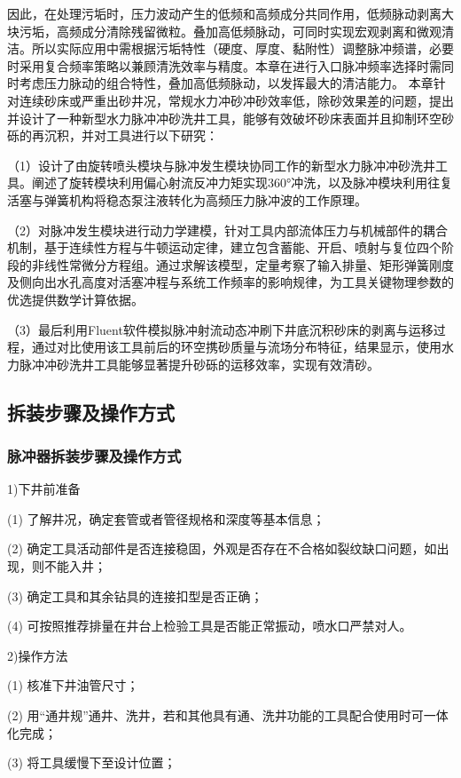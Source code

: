 因此，在处理污垢时，压力波动产生的低频和高频成分共同作用，低频脉动剥离大块污垢，高频成分清除残留微粒。叠加高低频脉动，可同时实现宏观剥离和微观清洁。所以实际应用中需根据污垢特性（硬度、厚度、黏附性）调整脉冲频谱，必要时采用复合频率策略以兼顾清洗效率与精度。本章在进行入口脉冲频率选择时需同时考虑压力脉动的组合特性，叠加高低频脉动，以发挥最大的清洁能力。
本章针对连续砂床或严重出砂井况，常规水力冲砂冲砂效率低，除砂效果差的问题，提出并设计了一种新型水力脉冲冲砂洗井工具，能够有效破坏砂床表面并且抑制环空砂砾的再沉积，并对工具进行以下研究：

（1）设计了由旋转喷头模块与脉冲发生模块协同工作的新型水力脉冲冲砂洗井工具。阐述了旋转模块利用偏心射流反冲力矩实现360°冲洗，以及脉冲模块利用往复活塞与弹簧机构将稳态泵注液转化为高频压力脉冲波的工作原理。

（2）对脉冲发生模块进行动力学建模，针对工具内部流体压力与机械部件的耦合机制，基于连续性方程与牛顿运动定律，建立包含蓄能、开启、喷射与复位四个阶段的非线性常微分方程组。通过求解该模型，定量考察了输入排量、矩形弹簧刚度及侧向出水孔高度对活塞冲程与系统工作频率的影响规律，为工具关键物理参数的优选提供数学计算依据。

（3）最后利用Fluent软件模拟脉冲射流动态冲刷下井底沉积砂床的剥离与运移过程，通过对比使用该工具前后的环空携砂质量与流场分布特征，结果显示，使用水力脉冲冲砂洗井工具能够显著提升砂砾的运移效率，实现有效清砂。




\subsection{拆装步骤及操作方式}
\subsubsection{脉冲器拆装步骤及操作方式}
1)下井前准备

(1) 了解井况，确定套管或者管径规格和深度等基本信息；

(2) 确定工具活动部件是否连接稳固，外观是否存在不合格如裂纹缺口问题，如出现，则不能入井；

(3) 确定工具和其余钻具的连接扣型是否正确；

(4) 可按照推荐排量在井台上检验工具是否能正常振动，喷水口严禁对人。

2)操作方法

(1) 核准下井油管尺寸；

(2) 用“通井规”通井、洗井，若和其他具有通、洗井功能的工具配合使用时可一体化完成；

(3) 将工具缓慢下至设计位置；

